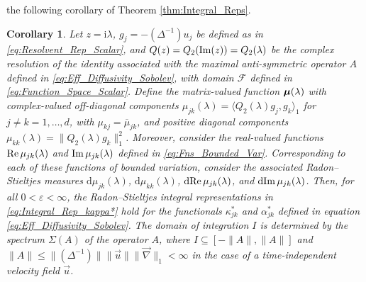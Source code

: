 \documentclass[11pt]{amsart}
\newcommand{\I}{\mathrm{i}}
\renewcommand{\d}{\mathrm{d}}
\newcommand{\Fc}{\mathcal{F}}
\newcommand\bmu{\mbox{\boldmath${\mu}$}}
\newtheorem{corollary}{Corollary}[section]
\begin{document}
the following corollary of Theorem \ref{thm:Integral_Reps}.
%
\begin{corollary}\label{cor:Integral_Reps}
%
Let $z=\I\lambda$, $g_j=-(\Delta^{-1})u_j$ be defined as in
\eqref{eq:Resolvent_Rep_Scalar}, and $Q(z)=Q_2({\rm Im}(z))=Q_2(\lambda)$ be
the complex resolution of the identity associated with the maximal
anti-symmetric operator $A$ defined in
\eqref{eq:Eff_Diffusivity_Sobolev}, with domain $\Fc$ defined in 
\eqref{eq:Function_Space_Scalar}.  Define the matrix-valued function
$\bmu(\lambda)$ with complex-valued off-diagonal components
$\mu_{jk}(\lambda)=\langle Q_2(\lambda)g_j,g_k\rangle_1$ for $j\neq k=1,\ldots,d$, with
$\mu_{kj}=\overline{\mu}_{jk}$, and positive diagonal components
$\mu_{kk}(\lambda)=\|Q_2(\lambda)g_k\|_1^2$.  Moreover, consider the real-valued
functions ${\rm Re}\,\mu_{jk}(\lambda)$ and ${\rm Im}\,\mu_{jk}(\lambda)$ defined in
\eqref{eq:Fns_Bounded_Var}. Corresponding to each of these functions
of bounded variation, consider the associated Radon--Stieltjes
measures $\d\mu_{jk}(\lambda)$, $\d\mu_{kk}(\lambda)$, $\d{\rm Re}\,\mu_{jk}(\lambda)$, and
$\d{\rm Im}\,\mu_{jk}(\lambda)$. Then, for all $0<\varepsilon<\infty$, the Radon--Stieltjes
integral representations in \eqref{eq:Integral_Rep_kappa*} hold for
the functionals $\kappa^*_{jk}$ and $\alpha^*_{jk}$ defined in equation
\eqref{eq:Eff_Diffusivity_Sobolev}. The domain of integration $I$ is
determined by the spectrum $\Sigma(A)$ of the operator $A$, where
$I\subseteq[-\|A\|,\|A\|]$ and $\|A\|\leq\|(\Delta^{-1})\|\|\vec{u}\|\|\vec{\nabla}\|_1<\infty$ in the case
of a time-independent velocity field $\vec{u}$.
% 
\end{corollary}
%
\end{document}
